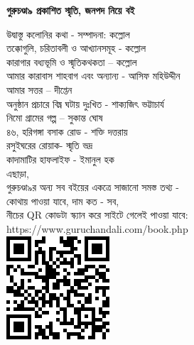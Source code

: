 \clearpage
\small
\centering
\textbf{গুরুচণ্ডা৯ প্রকাশিত স্মৃতি, জনপদ নিয়ে বই} \\
\raggedright
\scriptsize
উদ্বাস্তু কলোনির কথা - সম্পাদনা: কল্লোল \\
তক্কোগুলি, চরিতাবলী ও আখ্যানসমূহ - কল্লোল  \\
কারাগার বধ্যভূমি ও স্মৃতিকথকতা – কল্লোল \\
আমার কারাবাস শাহবাগ এবং অন্যান্য - আসিফ মহিউদ্দীন \\
আমার সত্তর – দীপ্তেন \\
অনুষ্ঠান প্রচারে বিঘ্ন ঘটায় দুঃখিত - শাক্যজিৎ ভট্টাচার্য \\
নিমো গ্রামের গল্প – সুকান্ত ঘোষ \\
৪৬, হরিগঙ্গা বসাক রোড - শক্তি দত্তরায় \\
রসুইঘরের রোয়াক- স্মৃতি ভদ্র \\
কাদামাটির হাফলাইফ - ইমানুল হক \\
\baselineskip
\raggedleft
\scriptsize
এছাড়া, \\
গুরুচণ্ডা৯র অন্য সব বইয়ের একত্রে সাজানো সমস্ত তথ্য - \\
কোথায় পাওয়া যাবে, দাম কত - সব, \\
নীচের QR কোডটা স্ক্যান করে সাইটে গেলেই পাওয়া যাবে: \\
https://www.guruchandali.com/book.php \\
\baselineskip
\includegraphics[scale=0.8]{Images/QRCode_2022.png}